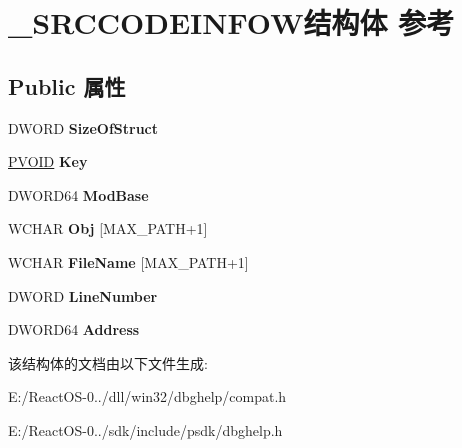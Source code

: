 \hypertarget{struct___s_r_c_c_o_d_e_i_n_f_o_w}{}\section{\+\_\+\+S\+R\+C\+C\+O\+D\+E\+I\+N\+F\+O\+W结构体 参考}
\label{struct___s_r_c_c_o_d_e_i_n_f_o_w}
\subsection*{Public 属性}
\begin{DoxyCompactItemize}
\item 
\mbox{\label{struct___s_r_c_c_o_d_e_i_n_f_o_w_ae6f9c72e97762df28369f1fdf6f80a64}} 
D\+W\+O\+RD {\bfseries Size\+Of\+Struct}
\item 
\mbox{\label{struct___s_r_c_c_o_d_e_i_n_f_o_w_aac7323b7b4984d4d326e2e9153bc16c5}} 
\hyperlink{interfacevoid}{P\+V\+O\+ID} {\bfseries Key}
\item 
\mbox{\label{struct___s_r_c_c_o_d_e_i_n_f_o_w_a1cd82918504004817ae69b85921c1024}} 
D\+W\+O\+R\+D64 {\bfseries Mod\+Base}
\item 
\mbox{\label{struct___s_r_c_c_o_d_e_i_n_f_o_w_a74da4eb8494878731a761718ff2dcf89}} 
W\+C\+H\+AR {\bfseries Obj} \mbox{[}M\+A\+X\+\_\+\+P\+A\+TH+1\mbox{]}
\item 
\mbox{\label{struct___s_r_c_c_o_d_e_i_n_f_o_w_a6cd364e3824fca06c58ddd2fba6a4423}} 
W\+C\+H\+AR {\bfseries File\+Name} \mbox{[}M\+A\+X\+\_\+\+P\+A\+TH+1\mbox{]}
\item 
\mbox{\label{struct___s_r_c_c_o_d_e_i_n_f_o_w_a966bd907e13538149c89521cf04b7705}} 
D\+W\+O\+RD {\bfseries Line\+Number}
\item 
\mbox{\label{struct___s_r_c_c_o_d_e_i_n_f_o_w_a44d8a3936c1c6ed33e81fa3ef558fa69}} 
D\+W\+O\+R\+D64 {\bfseries Address}
\end{DoxyCompactItemize}


该结构体的文档由以下文件生成\+:\begin{DoxyCompactItemize}
\item 
E\+:/\+React\+O\+S-\/0../dll/win32/dbghelp/compat.\+h\item 
E\+:/\+React\+O\+S-\/0../sdk/include/psdk/dbghelp.\+h\end{DoxyCompactItemize}

